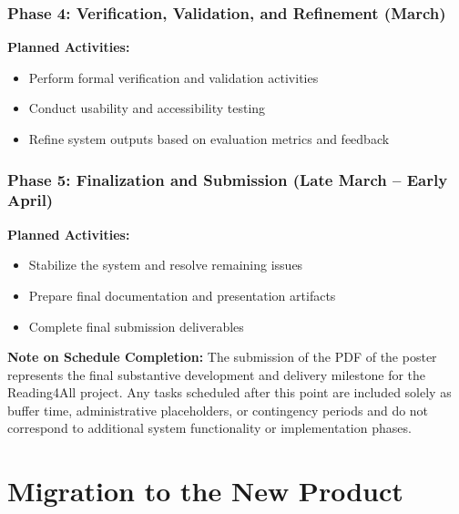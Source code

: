 \documentclass[12pt]{article}
\begin{document}
\subsubsection*{Phase 4: Verification, Validation, and Refinement (March)}
\textbf{Planned Activities:}
\begin{itemize}
  \item Perform formal verification and validation activities
  \item Conduct usability and accessibility testing
  \item Refine system outputs based on evaluation metrics and feedback
\end{itemize}

\subsubsection*{Phase 5: Finalization and Submission (Late March -- Early April)}
\textbf{Planned Activities:}
\begin{itemize}
  \item Stabilize the system and resolve remaining issues
  \item Prepare final documentation and presentation artifacts
  \item Complete final submission deliverables
\end{itemize}

\noindent\textbf{Note on Schedule Completion:}
The submission of the PDF of the poster represents the final
substantive development and delivery milestone for the Reading4All
project. Any tasks scheduled after this point are included solely as
buffer time, administrative placeholders, or contingency periods and
do not correspond to additional system functionality or implementation
phases.


\section{Migration to the New Product}
\end{document}

